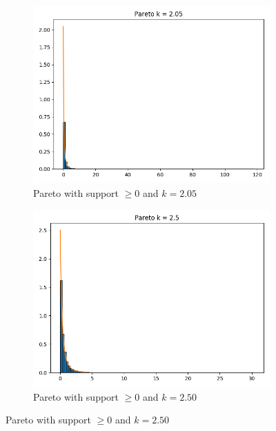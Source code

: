 \begin{figure}[H]
        \centering
        \begin{subfigure}[H]{0.475\textwidth}
            \centering
            \includegraphics[width=\textwidth]{par1.png}
            \caption[Network2]%
            {{\small Pareto with support $\geq 0$ and $k=2.05$}}    
            \label{fig:mean and std of net14}
        \end{subfigure}
        \hfill
        \begin{subfigure}[H]{0.475\textwidth}  
            \centering 
            \includegraphics[width=\textwidth]{par2.png}
            \caption[]%
            {{\small Pareto with support $\geq 0$ and $k=2.50$}}    
            \label{fig:mean and std of net24}

\end{subfigure}
\end{figure}

